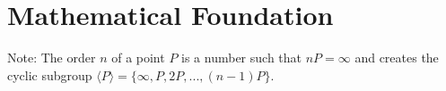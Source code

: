 \section{Mathematical Foundation}

Note: The order \(n\) of a point \(P\) is a number such that \(nP = \infty\) and creates
the cyclic subgroup \(\langle P \rangle = \{ \infty, P, 2P, ..., (n-1)P \} \).


